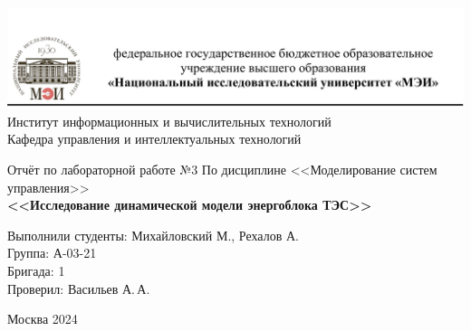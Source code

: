 \begin{titlepage}
	\newpage
	\begin{center}
		\includegraphics[width=\textwidth]{png/tit.png}
		Институт информационных и вычислительных технологий \\
			Кафедра управления и интеллектуальных технологий
		\vspace{1.25cm}
	\end{center}
	
	\vspace{1.2em}
	
	\begin{center}
		\begin{spacing}{1}
			{\Large Отчёт по лабораторной работе №3 \linebreak
			По дисциплине <<Моделирование систем управления>> \\}
			\large{\bf<<Исследование динамической модели энергоблока ТЭС>>}
		\end{spacing}
	\end{center}
	
	\vspace{5em}
	

	\vspace{6em}
	
		\noindent Выполнили студенты: Михайловский М., Рехалов А. \\
		Группа: А-03-21 \\
		Бригада: 1\\
		Проверил: Васильев А.\,А.
	
	
	\vspace{\fill}
	
	\begin{center}
		Москва 2024
	\end{center}
	
\end{titlepage}